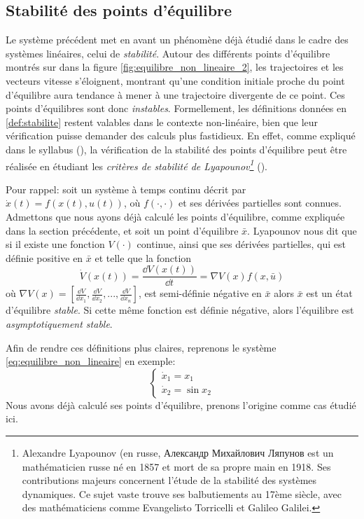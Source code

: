         \subsection{Stabilité des points d'équilibre}
            Le système précédent met en avant un phénomène déjà étudié dans le cadre des systèmes linéaires, celui de \textit{stabilité}. 
            Autour des différents points d'équilibre montrés sur dans la figure \ref{fig:equilibre_non_lineaire_2}, les trajectoires et les vecteurs vitesse s'éloignent, montrant qu'une condition initiale proche du point d'équilibre aura tendance à mener à une trajectoire divergente de ce point. Ces points d'équilibres sont donc \textit{instables}. Formellement, les définitions données en \ref{def:stabilite} restent valables dans le contexte non-linéaire, bien que leur vérification puisse demander des calculs plus fastidieux. En effet, comme expliqué dans le syllabus (\cite{infof305}), la vérification de la stabilité des points d'équilibre peut être réalisée en étudiant les \textit{critères de stabilité de Lyapounov\footnote{Alexandre Lyapounov (en russe, Александр Михайлович Ляпунов est un mathématicien russe né en 1857 et mort de sa propre main en 1918. Ses contributions majeurs concernent l'étude de la stabilité des systèmes dynamiques. Ce sujet vaste trouve ses balbutiements au 17ème siècle, avec des mathématiciens comme Evangelisto Torricelli et Galileo Galilei.}} (\cite{lyapounov}). 

            Pour rappel: soit un système à temps continu décrit par $\dot{x}(t) = f(x(t), u(t))$, où $f(\cdot, \cdot)$ et ses dérivées partielles sont connues. Admettons que nous ayons déjà calculé les points d'équilibre, comme expliquée dans la section précédente, et soit un point d'équilibre $\bar{x}$. Lyapounov nous dit que si il existe une fonction $V(\cdot)$ continue, ainsi que ses dérivées partielles, qui est définie positive en $\bar{x}$ et telle que la fonction 
            \begin{equation}
                \dot{V}(x(t)) = \frac{\dd V(x(t))}{\dd t} = \nabla V(x)f(x, \bar u)
            \end{equation}
            où $\nabla V(x) = [\frac{\dd V}{\dd x_1}, \frac{\dd V}{\dd x_2}, ..., \frac{\dd V}{\dd x_n}]$, est semi-définie négative en $\bar x$ alors $\bar x$ est un état d'équilibre \textit{stable}. Si cette même fonction est définie négative, alors l'équilibre est \textit{asymptotiquement stable}.

            Afin de rendre ces définitions plus claires, reprenons le système \ref{eq:equilibre_non_lineaire} en exemple:
            \begin{equation}
                \begin{cases}
                    \dot{x}_1 = x_1 \\
                    \dot{x}_2 = \sin{x_2}
                \end{cases}
            \end{equation}
            Nous avons déjà calculé ses points d'équilibre, prenons l'origine comme cas étudié ici.

